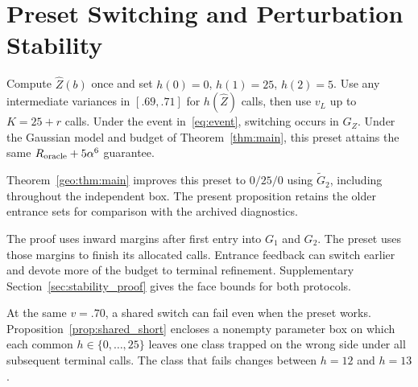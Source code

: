 \section{Preset Switching and Perturbation Stability}
\begin{proposition}\label{prop:preset}
Compute $\widehat Z(b)$ once and set $h(0)=0$, $h(1)=25$, $h(2)=5$. Use any intermediate variances in $[.69,.71]$ for $h(\widehat Z)$ calls, then use $v_L$ up to $K=25+r$ calls. Under the event in~\eqref{eq:event}, switching occurs in $G_Z$. Under the Gaussian model and budget of Theorem~\ref{thm:main}, this preset attains the same $R_{\rm oracle}+5\alpha^6$ guarantee.
\end{proposition}
Theorem~\ref{geo:thm:main} improves this preset to $0/25/0$ using $\widetilde G_2$, including throughout the independent box. The present proposition retains the older entrance sets for comparison with the archived diagnostics.

The proof uses inward margins after first entry into $G_1$ and $G_2$. The preset uses those margins to finish its allocated calls. Entrance feedback can switch earlier and devote more of the budget to terminal refinement. Supplementary Section~\ref{sec:stability_proof} gives the face bounds for both protocols.

At the same $v=.70$, a shared switch can fail even when the preset works. Proposition~\ref{prop:shared_short} encloses a nonempty parameter box on which each common $h\in\{0,\dots,25\}$ leaves one class trapped on the wrong side under all subsequent terminal calls. The class that fails changes between $h=12$ and $h=13$.

